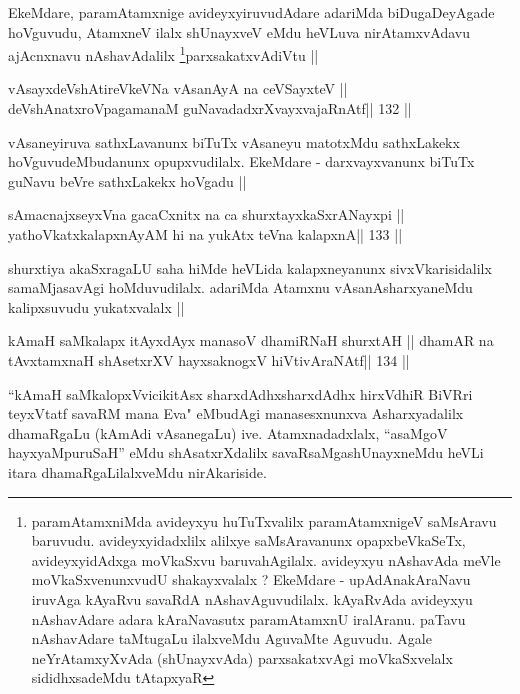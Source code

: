 \begin{artha}
EkeMdare, paramAtamxnige avideyxyiruvudAdare adariMda biDugaDeyAgade
hoVguvudu, AtamxneV ilalx shUnayxveV eMdu heVLuva nirAtamxvAdavu
ajAcnxnavu nAshavAdalilx \footnote[1]{paramAtamxniMda avideyxyu
  huTuTxvalilx paramAtamxnigeV saMsAravu baruvudu. avideyxyidadxlilx
  alilxye saMsAravanunx opapxbeVkaSeTx, avideyxyidAdxga moVkaSxvu
  baruvahAgilalx. avideyxyu nAshavAda meVle
  moVkaSxvenunxvudU shakayxvalalx ? EkeMdare - upAdAnakAraNavu
  iruvAga kAyaRvu savaRdA nAshavAguvudilalx. kAyaRvAda avideyxyu
  nAshavAdare adara kAraNavasutx paramAtamxnU iralAranu. paTavu
  nAshavAdare taMtugaLu ilalxveMdu AguvaMte Aguvudu. Agale
  neYrAtamxyXvAda (shUnayxvAda) parxsakatxvAgi moVkaSxvelalx
  sididhxsadeMdu tAtapxyaR}parxsakatxvAdiVtu ||
\end{artha}



\begin{shl}
vAsayxdeVshAtireVkeVNa vAsanAyA na ceVSayxteV ||
deVshAnatxroVpagamanaM guNavadadxrXvayxvajaRnAtf\hfill || 132 ||
\end{shl}

\begin{artha}
vAsaneyiruva sathxLavanunx biTuTx vAsaneyu matotxMdu sathxLakekx
hoVguvudeMbudanunx opupxvudilalx. EkeMdare - darxvayxvanunx biTuTx guNavu beVre sathxLakekx hoVgadu ||
\end{artha}

\begin{shl}
sAmacnajxseyxVna gacaCxnitx na ca shurxtayxkaSxrANayxpi ||
yathoVkatxkalapxnAyAM hi na yukAtx teVna kalapxnA\hfill || 133 ||
\end{shl}

\begin{artha}
shurxtiya akaSxragaLU saha hiMde heVLida kalapxneyanunx
sivxVkarisidalilx samaMjasavAgi hoMduvudilalx. adariMda Atamxnu
vAsanAsharxyaneMdu kalipxsuvudu yukatxvalalx ||
\end{artha}

\begin{shl}
kAmaH saMkalapx itAyxdAyx manasoV dhamiRNaH shurxtAH ||
dhamAR na tAvxtamxnaH shAsetxrXV hayxsaknogxV hiVtivAraNAtf\hfill || 134 ||
\end{shl}

\begin{artha}
``kAmaH saMkalopxVvicikitAsx sharxdAdhx\s sharxdAdhx hirxVdhiR BiVRri
  teyxVtatf savaRM mana Eva" eMbudAgi manasesxnunxva Asharxyadalilx
  dhamaRgaLu (kAmAdi vAsanegaLu) ive. Atamxnadadxlalx,
  ``asaMgoV hayxyaMpuruSaH'' eMdu shAsatxrXdalilx savaRsaMgashUnayxneMdu heVLi itara dhamaRgaLilalxveMdu nirAkariside.
\end{artha}

